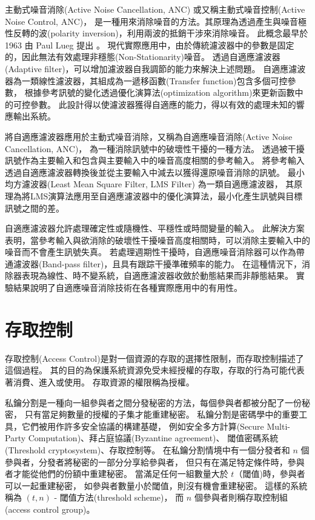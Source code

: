     主動式噪音消除(Active Noise Cancellation, ANC) 或又稱主動式噪音控制(Active Noise Control, ANC)，
是一種用來消除噪音的方法。其原理為透過產生與噪音極性反轉的波(polarity inversion)，利用兩波的抵銷干涉來消除噪音。
此概念最早於 1963 由 Paul Lueg 提出 \cite{elliott1993active}。
現代實際應用中，由於傳統濾波器中的參數是固定的，因此無法有效處理非穩態(Non-Stationarity)噪音。
透過自適應濾波器(Adaptive filter)，可以增加濾波器自我調節的能力來解決上述問題。
自適應濾波器為一類線性濾波器，其組成為一遞移函數(Transfer function)包含多個可控參數，
根據參考訊號的變化透過優化演算法(optimization algorithm)來更新函數中的可控參數。
此設計得以使濾波器獲得自適應的能力，得以有效的處理未知的響應輸出系統\cite{widrow1983adaptive}。

    將自適應濾波器應用於主動式噪音消除，又稱為自適應噪音消除(Active Noise Cancellation, ANC)，
為一種消除訊號中的破壞性干擾的一種方法。
透過被干擾訊號作為主要輸入和包含與主要輸入中的噪音高度相關的參考輸入。
將參考輸入透過自適應濾波器轉換後並從主要輸入中減去以獲得還原噪音消除的訊號。
最小均方濾波器(Least Mean Square Filter, LMS Filter) 為一類自適應濾波器，
其原理為將LMS演算法應用至自適應濾波器中的優化演算法，最小化產生訊號與目標訊號之間的差\cite{widrow1975adaptive}。

    自適應濾波器允許處理確定性或隨機性、平穩性或時間變量的輸入。
此解決方案表明，當參考輸入與欲消除的破壞性干擾噪音高度相關時，可以消除主要輸入中的噪音而不會產生訊號失真。
若處理週期性干擾時，自適應噪音消除器可以作為帶通濾波器(Band-pass filter)，且具有跟踪干擾準確頻率的能力。
在這種情況下，消除器表現為線性、時不變系統，自適應濾波器收斂於動態結果而非靜態結果。
實驗結果說明了自適應噪音消除技術在各種實際應用中的有用性\cite{singh2001adaptive}。


\section{存取控制}

    存取控制(Access Control)是對一個資源的存取的選擇性限制\cite{rfc4949}，而存取控制描述了這個過程。
其的目的為保護系統資源免受未經授權的存取，存取的行為可能代表著消費、進入或使用。
存取資源的權限稱為授權\cite{sandhu1994access}。

    私鑰分割是一種向一組參與者之間分發秘密的方法，每個參與者都被分配了一份秘密，
只有當足夠數量的授權的子集才能重建秘密。
私鑰分割是密碼學中的重要工具，它們被用作許多安全協議的構建基礎，
例如安全多方計算(Secure Multi-Party Computation)、拜占庭協議(Byzantine agreement)、
閾值密碼系統(Threshold cryptosystem)、存取控制等\cite{beimel2011secret}。
在私鑰分割情境中有一個分發者和 $n$ 個參與者，分發者將秘密的一部分分享給參與者，
但只有在滿足特定條件時，參與者才能從他們的份額中重建秘密。
當滿足任何一組數量大於 $t$（閾值)時，參與者可以一起重建秘密，
如參與者數量小於閾值，則沒有機會重建秘密。
這樣的系統稱為 $(t , n )$ - 閾值方法(threshold scheme)，
而 $n$ 個參與者則稱存取控制組(access control group)\cite{chum2012proposed}。
